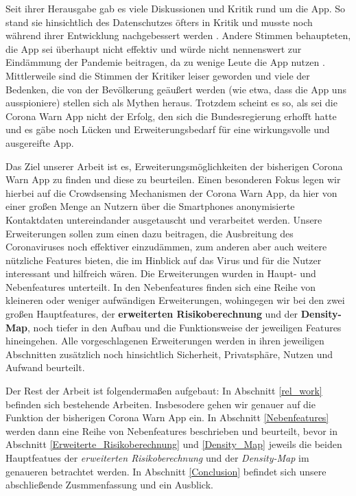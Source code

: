 \documentclass[conference,compsoc]{IEEEtran}
\begin{document}
Seit ihrer Herausgabe gab es viele Diskussionen und Kritik rund um die App. So stand sie hinsichtlich des Datenschutzes öfters in Kritik und musste noch während ihrer Entwicklung nachgebessert werden \cite{CWAKritik}. 
Andere Stimmen behaupteten, die App sei überhaupt nicht effektiv und würde nicht nennenswert zur Eindämmung der Pandemie beitragen, da zu wenige Leute die App nutzen \cite{CWAKritik2}.
Mittlerweile sind die Stimmen der Kritiker leiser geworden und viele der Bedenken, die von der Bevölkerung geäußert werden (wie etwa, dass die App uns ausspioniere) stellen sich als Mythen heraus. 
Trotzdem scheint es so, als sei die Corona Warn App nicht der Erfolg, den sich die Bundesregierung erhofft hatte und es gäbe noch Lücken und Erweiterungsbedarf für eine wirkungsvolle und ausgereifte App.

Das Ziel unserer Arbeit ist es, Erweiterungsmöglichkeiten der bisherigen Corona Warn App zu finden und diese zu beurteilen. 
Einen besonderen Fokus legen wir hierbei auf die Crowdsensing Mechanismen der Corona Warn App, da hier von einer großen Menge an Nutzern über die Smartphones anonymisierte Kontaktdaten untereindander ausgetauscht und verarbeitet werden.
Unsere Erweiterungen sollen zum einen dazu beitragen, die Ausbreitung des Coronaviruses noch effektiver einzudämmen, zum anderen aber auch weitere nützliche Features bieten, die im Hinblick auf das Virus und für die Nutzer interessant und hilfreich wären.
Die Erweiterungen wurden in Haupt- und Nebenfeatures unterteilt. 
In den Nebenfeatures finden sich eine Reihe von kleineren oder weniger aufwändigen Erweiterungen, wohingegen wir bei den zwei großen Hauptfeatures, der \textbf{erweiterten Risikoberechnung} und der \textbf{Density-Map}, noch tiefer in den Aufbau und die Funktionsweise der jeweiligen Features hineingehen.
Alle vorgeschlagenen Erweiterungen werden in ihren jeweiligen Abschnitten zusätzlich noch hinsichtlich Sicherheit, Privatsphäre, Nutzen und Aufwand beurteilt. 

Der Rest der Arbeit ist folgendermaßen aufgebaut: In Abschnitt \ref{rel_work} befinden sich bestehende Arbeiten. 
Insbesodere gehen wir genauer auf die Funktion der bisherigen Corona Warn App ein. 
In Abschnitt \ref{Nebenfeatures} werden dann eine Reihe von Nebenfeatures beschrieben und beurteilt,
bevor in Abschnitt \ref{Erweiterte_Risikoberechnung} und \ref{Density_Map} jeweils die beiden Hauptfeatues der \textit{erweiterten Risikoberechnung} und der \textit{Density-Map} im genaueren betrachtet werden. 
In Abschnitt \ref{Conclusion} befindet sich unsere abschließende Zusmmenfassung und ein Ausblick. 
\end{document}
